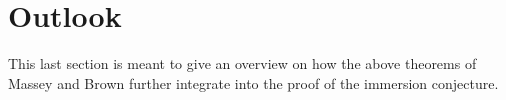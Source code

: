 % 

\chapter{Outlook}\label{chap:outlook}
This last section is meant to give an overview on how the above
theorems of Massey and Brown further integrate into the proof of the
immersion conjecture.


